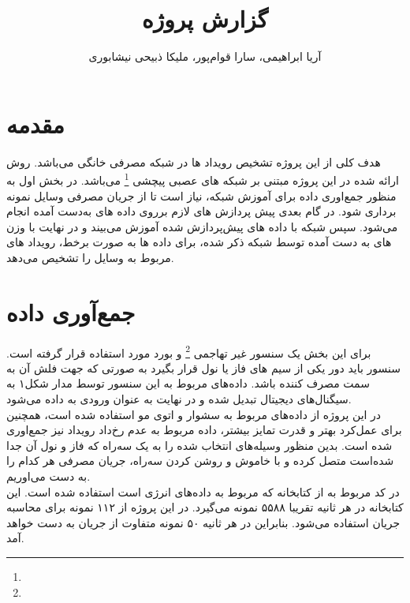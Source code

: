 \documentclass[12pt,onecolumn,a4paper]{article}
\begin{document}
\title{گزارش پروژه } 
\author{آریا ابراهیمی، سارا قوام‌پور، ملیکا ذبیحی نیشابوری\\}

\maketitle

\section{مقدمه} 
هدف کلی از این پروژه تشخیص رویداد ها در شبکه مصرفی خانگی می‌باشد. روش ارائه شده در این پروژه مبتنی بر شبکه های عصبی پیچشی 
\footnote{}
می‌باشد. در بخش اول به منظور جمع‌اوری داده برای آموزش شبکه، نیاز است تا از جریان مصرفی وسایل نمونه برداری شود. در گام بعدی پیش پردازش های لازم بر‌روی داده های به‌دست آمده انجام می‌شود. سپس شبکه با داده های پیش‌پردازش شده آموزش می‌بیند و در نهایت با وزن های به دست آمده توسط شبکه ذکر شده، برای داده ها به صورت برخط، رویداد های مربوط به وسایل را تشخیص می‌دهد.


\section{جمع‌آوری داده‌}
برای این بخش یک سنسور غیر تهاجمی
\footnote{}
و بورد 
مورد استفاده قرار گرفته است. سنسور  باید دور یکی از سیم های فاز یا نول قرار بگیرد به صورتی که جهت فلش آن به سمت مصرف کننده باشد. داده‌های مربوط به این سنسور توسط مدار شکل۱ به سیگنال‌های دیجیتال تبدیل شده و در نهایت به عنوان ورودی به  داده می‌شود.\\
در این پروژه از داده‌های مربوط به سشوار و اتوی مو استفاده شده است، همچنین برای عمل‌کرد بهتر و قدرت تمایز بیشتر، داده مربوط به عدم رخ‌داد رویداد نیز جمع‌اوری شده است. بدین منظور وسیله‌های انتخاب شده را به یک سه‌راه که فاز و نول آن جدا شده‌است متصل کرده و با خاموش و روشن کردن سه‌راه، جریان مصرفی هر کدام را به دست می‌اوریم.\\
در کد مربوط به  از کتابخانه 
که مربوط به داده‌های انرژی است استفاده شده است. این کتابخانه در هر ثانیه تقریبا ۵۵۸۸ نمونه می‌گیرد. در این پروژه از ۱۱۲ نمونه برای محاسبه جریان 
استفاده می‌شود. بنابراین در هر ثانیه ۵۰ نمونه متفاوت از جریان  به دست خواهد آمد.
\end{document}
